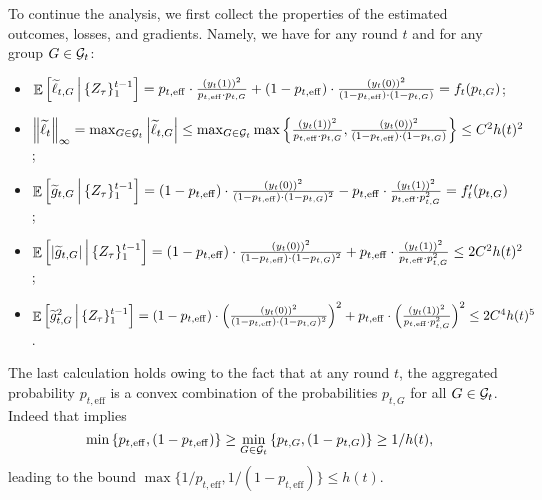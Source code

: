     To continue the analysis, we first collect the properties of the estimated outcomes, losses, and gradients. Namely, we have for any round $t$ and for any group $G \in \mathcal{G}_t$:
    \begin{itemize}
        \item $\mathop{\mathbb{E}} \left[\widetilde{\ell}_{t, G} \, \Big|  \, \{Z_\tau\}_1^{t-1} \right] 
        = p_{t, \mathrm{eff}} \cdot \frac{(y_t(1))^2}{p_{t, \mathrm{eff}} \cdot p_{t, G}} + (1 - p_{t, \mathrm{eff}}) \cdot \frac{(y_t(0))^2}{(1 - p_{t, \mathrm{eff}}) \cdot (1-p_{t, G})} 
        = f_t(p_{t, G})$;
        \item $ \left\lVert\widetilde{\ell}_{t}\right\rVert_\infty = \max_{G \in \mathcal{G}_t} \left| \widetilde{\ell}_{t, G} \right| 
        \leq \max_{G \in \mathcal{G}_t} \max\left\{ \frac{(y_t(1))^2}{p_{t, \mathrm{eff}} \cdot p_{t, G}}, \frac{(y_t(0))^2}{(1 - p_{t, \mathrm{eff}}) \cdot (1-p_{t, G})} \right\} 
        \leq C^2 h(t)^2$; 
        \item $\mathop{\mathbb{E}} \left[\widetilde{g}_{t, G} \, \Big|  \, \{Z_\tau\}_1^{t-1} \right] 
        = (1 - p_{t, \mathrm{eff}}) \cdot \frac{(y_t(0))^2}{(1 - p_{t, \mathrm{eff}}) \cdot (1-p_{t, G})^2} 
        - p_{t, \mathrm{eff}} \cdot \frac{(y_t(1))^2}{p_{t, \mathrm{eff}} \cdot p^2_{t, G}} 
        = f'_t(p_{t, G})$;
        \item $\mathop{\mathbb{E}} \left[|\widetilde{g}_{t, G}| \, \Big|  \, \{Z_\tau\}_1^{t-1} \right] 
        = (1 - p_{t, \mathrm{eff}}) \cdot \frac{(y_t(0))^2}{(1 - p_{t, \mathrm{eff}}) \cdot (1-p_{t, G})^2} 
        + p_{t, \mathrm{eff}} \cdot \frac{(y_t(1))^2}{p_{t, \mathrm{eff}} \cdot p^2_{t, G}} 
        \leq 2 C^2 h(t)^2$;
        \item $\mathop{\mathbb{E}} \left[\widetilde{g}_{t, G}^2 \, \Big|  \, \{Z_\tau\}_1^{t-1} \right] 
        = (1 - p_{t, \mathrm{eff}}) \cdot \left( \frac{(y_t(0))^2}{(1 - p_{t, \mathrm{eff}}) \cdot (1-p_{t, G})^2} \right)^2
        + p_{t, \mathrm{eff}} \cdot \left( \frac{(y_t(1))^2}{p_{t, \mathrm{eff}} \cdot p^2_{t, G}} \right)^2
        \leq 2C^4 h(t)^5$.
    \end{itemize}
    The last calculation holds owing to the fact that at any round $t$, the aggregated probability $p_{t, \mathrm{eff}}$ is a convex combination of the probabilities $p_{t, G}$ for all $G \in \mathcal{G}_t$. Indeed that implies 
    \[\min\left\{p_{t, \mathrm{eff}}, \left(1-p_{t, \mathrm{eff}} \right)\right\} \geq \min_{G \in \mathcal{G}_t} \left\{p_{t, G}, \left(1-p_{t, G} \right)\right\} \geq 1/h(t),\] 
    leading to the bound $\max \{1/p_{t, \mathrm{eff}}, 1/ \left(1-p_{t, \mathrm{eff}} \right)\} \leq h(t)$.

